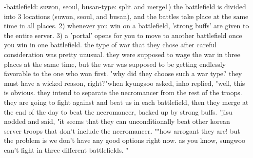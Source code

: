 -battlefield: suwon, seoul, busan-type: split and merge1) the battlefield is divided into 3 locations (suwon, seoul, and busan), and the battles take place at the same time in all places.
2) whenever you win on a battlefield, 'strong buffs' are given to the entire server.
3) a 'portal' opens for you to move to another battlefield once you win in one battlefield.
 the type of war that they chose after careful consideration was pretty unusual.
 they were supposed to wage the war in three places at the same time, but the war was supposed to be getting endlessly favorable to the one who won first.
"why did they choose such a war type? they must have a wicked reason, right?"when kyungsoo asked, inho replied, "well, this is obvious.
 they intend to separate the necromancer from the rest of the troops.
 they are going to fight against and beat us in each battlefield, then they merge at the end of the day to beat the necromancer, backed up by strong buffs.
"jisu nodded and said, "it seems that they can unconditionally beat other korean server troops that don't include the necromancer.
""how arrogant they are! but the problem is we don't have any good options right now.
 as you know, sungwoo can't fight in three different battlefields.
"

 